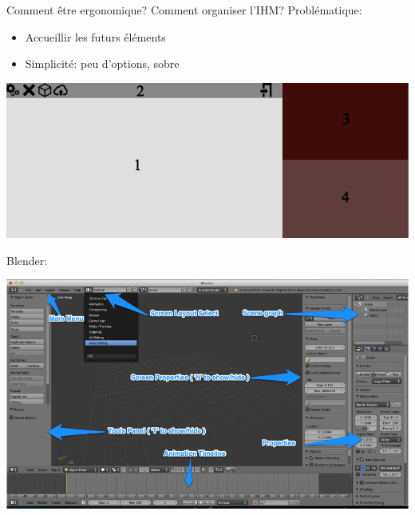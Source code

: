\documentclass[a4paper,10pt]{beamer}
\begin{document}
			
			\begin{frame}{Comment être ergonomique?}
				Comment organiser l'IHM?
				Problématique:
				\begin{itemize}
					\item Accueillir les futurs éléments
					\item Simplicité: peu d'options, sobre
				\end{itemize}

				\centerline{\includegraphics[scale=0.3]{images/Nono/img6.png}}
			Blender:
				\centerline{\includegraphics[scale=0.2]{images/Nono/img5.png}} 
			\end{frame}
		
\end{document}
